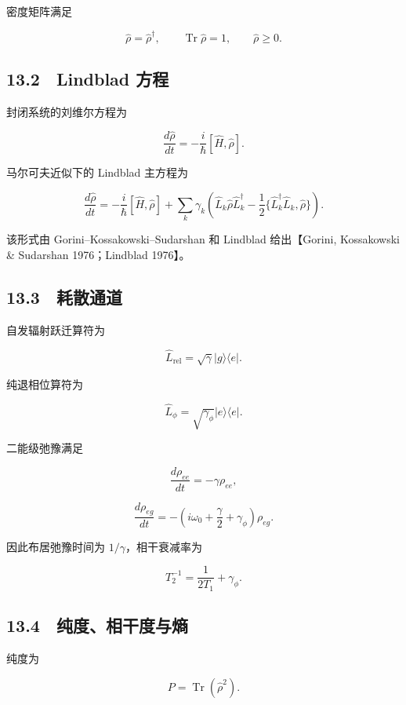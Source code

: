 \documentclass[
  a4paper,
]{ctexbook}
\begin{document}
密度矩阵满足

\[
\hat\rho=\hat\rho^{\dagger},
\qquad
\operatorname{Tr}\hat\rho=1,
\qquad
\hat\rho\ge0.
\]

\hypertarget{lindblad-ux65b9ux7a0b}{%
\subsection{13.2　Lindblad 方程}\label{lindblad-ux65b9ux7a0b}}

封闭系统的刘维尔方程为

\[
\frac{d\hat\rho}{dt}
=
-\frac{i}{\hbar}[\hat H,\hat\rho].
\]

马尔可夫近似下的 Lindblad 主方程为

\[
\frac{d\hat\rho}{dt}
=
-\frac{i}{\hbar}[\hat H,\hat\rho]
+
\sum_k\gamma_k
\left(
\hat L_k\hat\rho\hat L_k^{\dagger}
-
\frac12
\{\hat L_k^{\dagger}\hat L_k,\hat\rho\}
\right).
\]

该形式由 Gorini--Kossakowski--Sudarshan 和 Lindblad 给出【Gorini,
Kossakowski \& Sudarshan 1976；Lindblad 1976】。

\hypertarget{ux8017ux6563ux901aux9053}{%
\subsection{13.3　耗散通道}\label{ux8017ux6563ux901aux9053}}

自发辐射跃迁算符为

\[
\hat L_{\mathrm{rel}}=\sqrt{\gamma}|g\rangle\langle e|.
\]

纯退相位算符为

\[
\hat L_{\phi}=\sqrt{\gamma_\phi}|e\rangle\langle e|.
\]

二能级弛豫满足

\[
\frac{d\rho_{ee}}{dt}=-\gamma\rho_{ee},
\]

\[
\frac{d\rho_{eg}}{dt}
=
-\left(i\omega_0+\frac{\gamma}{2}+\gamma_\phi\right)\rho_{eg}.
\]

因此布居弛豫时间为 \(1/\gamma\)，相干衰减率为

\[
T_2^{-1}=\frac{1}{2T_1}+\gamma_\phi.
\]

\hypertarget{ux7eafux5ea6ux76f8ux5e72ux5ea6ux4e0eux71b5}{%
\subsection{13.4　纯度、相干度与熵}\label{ux7eafux5ea6ux76f8ux5e72ux5ea6ux4e0eux71b5}}

纯度为

\[
P=\operatorname{Tr}(\hat\rho^2).
\]
\end{document}
